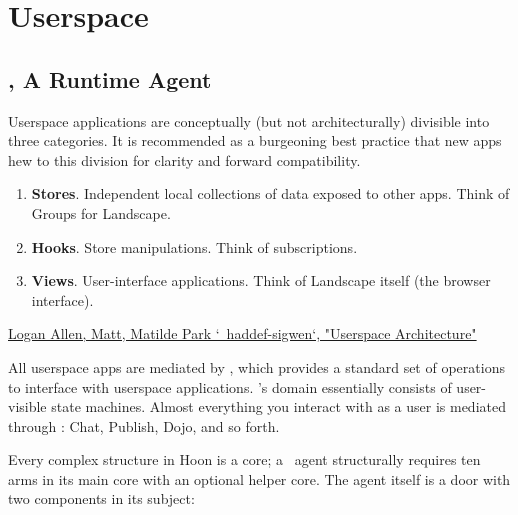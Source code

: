 \setchapterpreamble[u]{\margintoc}
\chapter{Userspace}

\section{\gall, A Runtime Agent}

Userspace applications are conceptually (but not architecturally) divisible into three categories.  It is recommended as a burgeoning best practice that new apps hew to this division for clarity and forward compatibility.

\begin{enumerate}
  \item  \textbf{Stores}.  Independent local collections of data exposed to other apps.  Think of Groups for Landscape.
  \item  \textbf{Hooks}.  Store manipulations.  Think of subscriptions.
  \item  \textbf{Views}.  User-interface applications.  Think of Landscape itself (the browser interface).
\end{enumerate}

\href{https://docs.google.com/document/d/1hS_UuResG1S4j49_H-aSshoTOROKBnGoJAaRgOipf54/edit}{Logan Allen, Matt, Matilde Park `~haddef-sigwen`, "Userspace Architecture"}


All userspace apps are mediated by \gall, which provides a standard set of operations to interface with userspace applications.  \gall's domain essentially consists of user-visible state machines.  Almost everything you interact with as a user is mediated through \gall:  Chat, Publish, Dojo, and so forth.


Every complex structure in Hoon is a core; a \gall~agent structurally requires ten arms in its main core with an optional helper core.  The agent itself is a door with two components in its subject:

